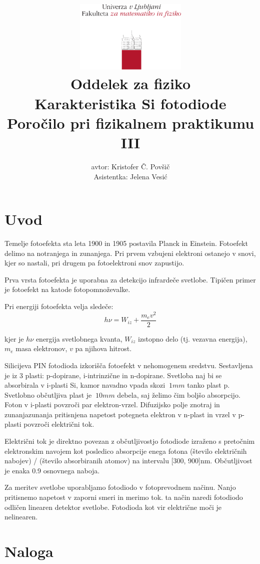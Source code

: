 \documentclass[12pt]{report}
\title{
  \includegraphics[width=0.4\textwidth]{fmf_logo}\\
  {\small Oddelek za fiziko} \\
  {Karakteristika Si fotodiode}\\
  {\small Poročilo pri fizikalnem praktikumu III}\\

}
\date{}
\author{ avtor: Kristofer Č. Povšič \\[5 cm]
 \small  Asistentka: Jelena Vesić
}
\begin{document}
\setcounter{page}{2}

\maketitle

\chapter*{Uvod}

Temelje fotoefekta sta leta 1900 in 1905 postavila Planck in Einstein. Fotoefekt delimo na notranjega in zunanjega. Pri prvem vzbujeni elektroni ostanejo v snovi, kjer so nastali, pri drugem pa fotoelektroni snov zapustijo. 

Prva vrsta fotoefekta je uporabna za detekcijo infrardeče svetlobe. Tipičen primer je fotoefekt na katode fotopomnoževalke. 

Pri energiji fotoefekta velja sledeče: 
\begin{equation}
  h\nu=W_{iz} + \frac{m_e v^2}{2}
\end{equation}

kjer je $h\nu$ energija svetlobnega kvanta, $W_{iz}$ izstopno delo (tj. vezavna energija), $m_e$ masa elektronov, $v$ pa njihova hitrost. 

Silicijeva PIN fotodioda izkorišča fotoefekt v nehomogenem sredstvu. Sestavljena je iz 3 plasti: p-dopirane, i-intrinzične in n-dopirane. Svetloba naj bi se absorbirala v i-plasti Si, kamor navadno vpada skozi $~1mm$ tanko plast p. Svetlobno občutljiva plast je $~10mm$ debela, saj želimo čim boljšo absorpcijo. Foton v i-plasti povzroči par elektron-vrzel. Difuzijsko polje znotraj in zunanjazunanja pritisnjena napetost potegneta elektron v n-plast in vrzel v p-plasti povzroči električni tok. 

Električni tok je direktno povezan z občutljivostjo fotodiode izraženo s pretočnim elektronskim navojem kot posledico absorpcije enega fotona (število električnih nabojev) / (število absorbiranih atomov) na intervalu [300, 900]nm. Občutljivost je enaka 0.9 osnovnega naboja. 

Za meritev svetlobe uporabljamo fotodiodo v fotoprevodnem načinu. Nanjo pritisnemo napetost v zaporni smeri in merimo tok. ta način naredi fotodiodo odličen linearen detektor svetlobe. Fotodioda kot vir električne moči je nelinearen. 

\chapter*{Naloga}
\end{document}
